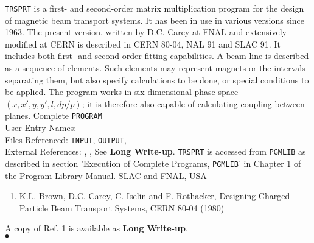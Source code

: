                              
             
                       
{\tt TRSPRT} is a first- and second-order matrix multiplication program
for the design of magnetic beam transport systems. It has been in
use in various versions since 1963. The present version, written by
D.C. Carey at FNAL and extensively modified at CERN is described in
CERN 80-04, NAL 91 and SLAC 91. It includes both first- and
second-order fitting capabilities. A beam line is described as a
sequence of elements. Such elements may represent magnets or the
intervals separating them, but also specify calculations to be done, or
special conditions to be applied. The program works in six-dimensional
phase space $(x,x',y,y',l,dp/p)$; it is therefore also capable of
calculating coupling between planes.
\Structure
Complete {\tt PROGRAM}\\
User Entry Names: \\
Files Referenced: {\tt INPUT}, {\tt OUTPUT}, \\
External References: , ,
\Usage
See {\bf Long Write-up}. {\tt TRSPRT} is accessed from
{\tt PGMLIB} as described in section 'Execution of Complete Programs,
{\tt PGMLIB}' in Chapter 1 of the Program Library Manual.
\Source
SLAC and FNAL, USA
\Refer
\begin{enumerate}
\item K.L. Brown, D.C. Carey, C. Iselin and F. Rothacker,
Designing Charged Particle Beam Transport Systems, CERN 80-04 (1980)
\end{enumerate}
A copy of Ref. 1 is available as {\bf Long Write-up}.
\\ $\bullet$
